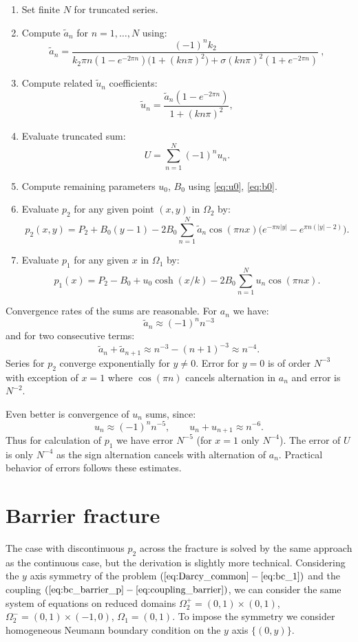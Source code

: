 \documentclass[a4paper,10pt]{article}
\begin{document}
\begin{enumerate}
    \item Set finite $N$ for truncated series. 
    \item Compute $\tilde a_n$ for $n = 1, \dots, N$ using:
    \[
        \tilde a_n = \frac{(-1)^n k_2}{ k_2 \pi n (1 - e^{-2\pi n}) \big(1 + (k n \pi)^2\big) 
            + \sigma (k n \pi)^2 (1 + e^{-2\pi n})} \ , 
    \]
    \item Compute related $\tilde u_n$ coefficients:
    \[
        \tilde u_n = \frac{\tilde a_n (1 - e^{-2\pi n})}{1 + (k n \pi)^2}, 
    \]
    \item Evaluate truncated sum:
    \[
        U =  \sum_{n=1}^{N} (-1)^n u_n.
    \]
    \item Compute remaining parameters $u_0$, $B_0$ using \eqref{eq:u0}, \eqref{eq:b0}.
    \item Evaluate $p_2$ for any given point $(x,y)$ in $\Omega_2$ by:
    \[
        p_2(x,y) = P_2 + B_0(y-1) -2B_0 \sum_{n=1}^N \tilde a_n \cos(\pi n x) 
        \Big( e^{-\pi n |y|} - e^{\pi n (|y|-2)}\Big).
    \]
    \item Evaluate $p_1$ for any given $x$ in $\Omega_1$ by:
    \[
        p_1(x) = P_2 - B_0 + u_0 \cosh(x/k) - 2 B_0 \sum_{n=1}^N  u_n \cos(\pi n x). 
    \]    
\end{enumerate}

Convergence rates of the sums are reasonable. For $a_n$ we have:
\[
    \tilde a_n \approx (-1)^n n^{-3} 
\]
and for two consecutive terms:
\[
    \tilde a_n + \tilde a_{n+1} \approx n^{-3} - (n+1)^{-3} \approx  n^{-4}. 
\]
Series for $p_2$ converge exponentially for $y\ne 0$. Error for $y=0$ is of order $N^{-3}$ with exception
of  $x=1$ where $\cos(\pi n)$ cancels alternation in $a_n$ and error is $N^{-2}$.

Even better is convergence of $u_n$ sums, since:
\[
    u_n \approx (-1)^n n^{-5},\qquad u_n+u_{n+1} \approx  n^{-6}.
\]
Thus for calculation of $p_1$ we have error  $N^{-5}$ (for $x=1$ only $N^{-4}$). The error of $U$ is only $N^{-4}$ 
as the sign alternation cancels with alternation of $a_n$.
Practical behavior of errors follows these estimates.



\section{Barrier fracture}
\label{sec:barrier_frac}
The case with discontinuous $p_2$ across the fracture is solved by the same approach as the continuous case, 
but the derivation is slightly more technical. Considering the $y$ axis symmetry of the problem $(\ref{eq:Darcy_common} - \ref{eq:bc_1})$ and 
the coupling $(\ref{eq:bc_barrier_p} - \ref{eq:coupling_barrier})$, we can consider the same system of equations 
on reduced domains $\Omega_2^+ = (0,1)\times (0,1)$, $\Omega_2^- = (0,1)\times(-1,0)$,
$\Omega_1 = (0,1)$. To impose the symmetry we consider homogeneous Neumann boundary condition on the $y$ axis $\{(0,y)\}$.
\end{document}
